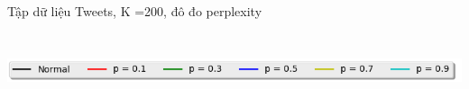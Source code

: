 \documentclass[pdf]{beamer}
\begin{document}
\begin{frame}{Tập dữ liệu Tweets, K =200, đô đo perplexity}
\begin{columns}[T] %
	\begin{column}{.50\textwidth}
		\begin{figure}
		\end{figure}
	\end{column} %
	\hfill%
	\begin{column}{.50\textwidth}
		\begin{figure}
		\end{figure}				
	\end{column} %
\end{columns}
\begin{center}
	\includegraphics[width=1\textwidth]{menu.png}	
\end{center}
\end{frame}
\end{document}
